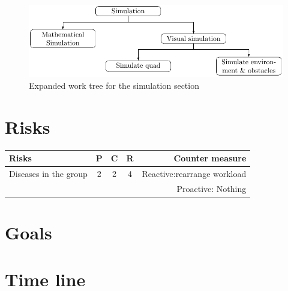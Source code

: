 \documentclass{article}
\begin{document}
		\begin{figure}[H]
			\centering
			\includegraphics[width=.8\linewidth]{Workplan_work_tree/simulation_work_tree_diagram}
			\caption{Expanded work tree for the simulation section}
		\end{figure}

			
	
	\section{Risks}
		\begin{tabular}{|l|c|c|c|r|}			
			Risks & P & C & R & Counter measure \\
			\hline
			Diseases in the group  & 2 & 2 & 4 & Reactive:rearrange workload 				\\ & & & & Proactive: Nothing \\
			
				
		\end{tabular}		
	\section{Goals}
		
	\section{Time line}
	
\end{document}

